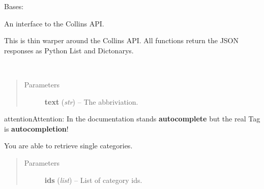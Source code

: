 \documentclass[letterpaper,10pt,english]{sphinxmanual}
\begin{document}
\begin{fulllineitems}
\label{collins:collins.Collins}
Bases: 

An interface to the Collins API.

This is thin warper around the Collins API.
All functions return the JSON responses as Python List and Dictonarys.

\begin{fulllineitems}
\label{collins:collins.Collins.autocomplete}~\begin{quote}\begin{description}
\item[{Parameters}] \leavevmode
\textbf{text} (\emph{str}) -- The abbriviation.

\end{description}\end{quote}

\begin{notice}{attention}{Attention:}
In the documentation stands \textbf{autocomplete} but the real
Tag is \textbf{autocompletion}!
\end{notice}

\end{fulllineitems}


\begin{fulllineitems}
\label{collins:collins.Collins.basketadd}
\end{fulllineitems}


\begin{fulllineitems}
\label{collins:collins.Collins.basketget}
\end{fulllineitems}


\begin{fulllineitems}
\label{collins:collins.Collins.category}
You are able to retrieve single categories.
\begin{quote}\begin{description}
\item[{Parameters}] \leavevmode
\textbf{ids} (\emph{list}) -- List of category ids.


\end{description}
\end{quote}
\end{fulllineitems}
\end{fulllineitems}
\end{document}
